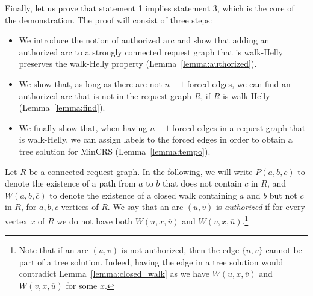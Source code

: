 \documentclass[11pt]{article}%
\begin{document}
Finally, let us prove that statement 1 implies statement 3, which is the core of the demonstration. 
The proof will consist of three steps:
\begin{itemize}
    \item We introduce the notion of authorized arc and show that adding an authorized arc to a strongly connected request graph that is walk-Helly preserves the walk-Helly property (Lemma~\ref{lemma:authorized}).
    \item We show that, as long as there are not $n-1$ forced edges, we can find an authorized arc that is not in the request graph $R$, if $R$ is walk-Helly (Lemma~\ref{lemma:find}). 
    \item We finally show that, when having $n-1$ forced edges in a request graph that is walk-Helly, we can assign labels to the forced edges in order to obtain a tree solution for MinCRS (Lemma~\ref{lemma:tempo}). 
\end{itemize}



Let $R$ be a connected request graph. In the following, we will write $P(a,b,\overline{c})$ to denote the existence of a path from $a$ to $b$ that does not contain $c$ in $R$, and $W(a,b,\overline{c})$ to denote the existence of a closed walk containing $a$ and $b$ but not $c$ in $R$, for $a,b,c$ vertices of $R$. We say that an arc $(u,v)$ is {\it authorized} if for every vertex $x$ of $R$ we do not have both $W(u,x,\overline{v})$ and $W(v,x,\overline{u})$.\footnote{Note that if an arc $(u,v)$ is not authorized, then the edge $\{u,v\}$ cannot be part of a tree solution. Indeed, having the edge in a tree solution would contradict Lemma~\ref{lemma:closed_walk} as we have $W(u,x,\overline{v})$ and $W(v,x,\overline{u})$ for some $x$.} 
\end{document}
